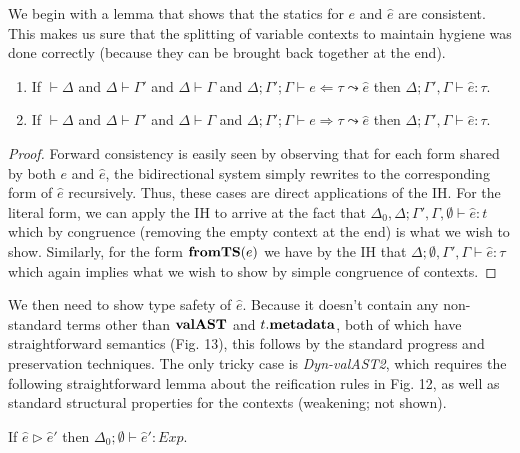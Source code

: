 We begin with a lemma that shows that the statics for $e$ and $\hat{e}$ are consistent. This makes us sure that the splitting of variable contexts to maintain hygiene was done correctly (because they can be brought back together at the end). 
\begin{lemma}
\begin{enumerate}
\item \hspace{-5px}
If $\vdash \Delta$ and $\Delta \vdash \Gamma'$ and $\Delta \vdash \Gamma$ and $\Delta; \Gamma'; \Gamma \vdash e \Leftarrow \tau \leadsto \hat{e}$ then $\Delta; \Gamma', \Gamma \vdash \hat{e} : \tau$. 
\item \hspace{-5px} If $\vdash \Delta$ and $\Delta \vdash \Gamma'$ and $\Delta \vdash \Gamma$ and $\Delta; \Gamma'; \Gamma \vdash e \Rightarrow \tau \leadsto \hat{e}$ then $\Delta; \Gamma', \Gamma \vdash \hat{e} : \tau$. 
\end{enumerate}
\end{lemma}
\begin{proof}
Forward consistency is easily seen by observing that for each form shared by both $e$ and $\hat{e}$, the bidirectional system simply rewrites to the corresponding form of $\hat{e}$ recursively. Thus, these cases are direct applications of the IH. For the literal form, we can apply the IH to arrive at the fact that $\Delta_0, \Delta; \Gamma', \Gamma, \emptyset \vdash \hat{e} : t$ which by congruence (removing the empty context at the end) is what we wish to show. Similarly, for the form $\textbf{fromTS}(e)$ we have by the IH that $\Delta; \emptyset, \Gamma', \Gamma \vdash \hat{e} : \tau$ which again implies what we wish to show by simple congruence of contexts.
\end{proof}

We then need to show type safety of $\hat{e}$. Because it doesn't contain any non-standard terms other than $\textbf{valAST}$ and $t.\textbf{metadata}$, both of which have straightforward semantics (Fig. 13), this follows by the standard progress and preservation techniques. The only tricky case is \textit{Dyn-valAST2}, which requires the following straightforward lemma about the reification rules in Fig. 12, as well as standard structural properties for the contexts (weakening; not shown).
\begin{lemma}[Reification]
If $\hat{e} \triangleright \hat{e}'$ then $\Delta_0; \emptyset \vdash \hat{e}' : Exp$. 
\end{lemma}

